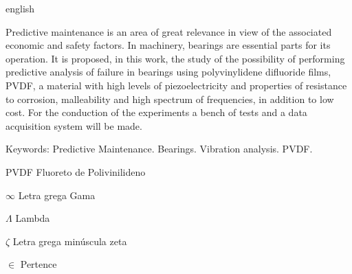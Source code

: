 \documentclass[
	12pt,				
	oneside,			
	a4paper,			
	english,			
	brazil				
	]{abntex2ppgsi}
\begin{document}
\begin{resumo}[Abstract]
\begin{otherlanguage*}{english}

Predictive maintenance is an area of great relevance in view of the associated economic and safety factors. In machinery, bearings are essential parts for its operation. It is proposed, in this work, the study of the possibility of performing predictive analysis of failure in bearings using polyvinylidene difluoride films, PVDF, a material with high levels of piezoelectricity and properties of resistance to corrosion, malleability and high spectrum of frequencies, in addition to low cost. For the conduction of the experiments a bench of tests and a data acquisition system will be made.

Keywords: Predictive Maintenance. Bearings. Vibration analysis. PVDF.
\end{otherlanguage*}
\end{resumo}

\listoffigures*
\cleardoublepage
\listoftables*
\cleardoublepage

%
%
\begin{siglas}
  \item[PVDF] Fluoreto de Polivinilideno
\end{siglas}


\begin{simbolos}
  \item[$ \infty $] Letra grega Gama
  \item[$ \Lambda $] Lambda
  \item[$ \zeta $] Letra grega minúscula zeta
  \item[$ \in $] Pertence
\end{simbolos}

\tableofcontents*
\cleardoublepage
\end{document}
